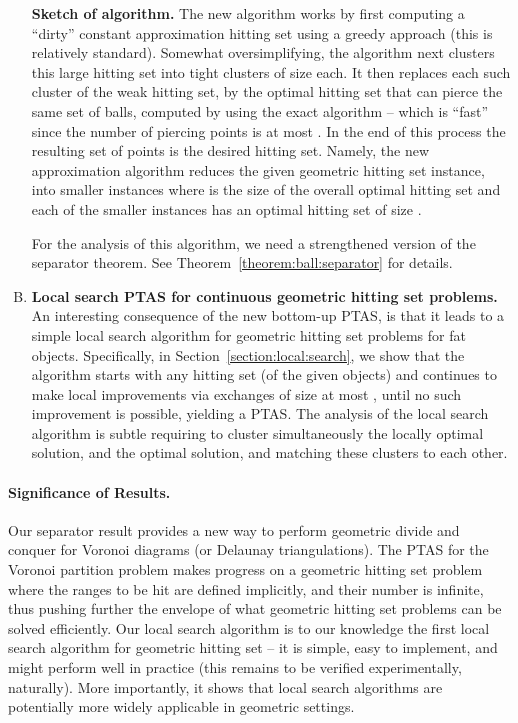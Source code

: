 \InSubmitVer{\documentclass[11pt]{article}}
\numberwithin{figure}{section}
\numberwithin{table}{section}
\numberwithin{equation}{section}
\newcommand{\secref}[1]{Section~\ref{section:#1}}
\newcommand{\thmrefpage}[1]{Theorem~\ref{theorem:#1}}
\newcommand{\Term}[1]{\textsf{#1}}
\newcommand{\PTAS}{\Term{PTAS}\xspace}
\begin{document}
\begin{enumerate}[(A)]
        
    \medskip \textbf{Sketch of algorithm.} The new algorithm works by first computing a ``dirty'' constant
    approximation hitting set using a greedy approach (this is
    relatively standard). Somewhat oversimplifying, the algorithm next
    clusters this large hitting set into tight clusters of size  each. It then replaces each such cluster of the weak
    hitting set, by the optimal hitting set that can pierce the same
    set of balls, computed by using the exact algorithm -- which is
    ``fast'' since the number of piercing points is at most
    . In the end of this process the resulting set of
    points is the desired hitting set.  Namely, the new approximation
    algorithm reduces the given geometric hitting set instance, into
     smaller instances where  is the size of the overall
    optimal hitting set and each of the smaller instances has an
    optimal hitting set of size .
    


    For the analysis of this algorithm, we need a strengthened version
    of the separator theorem. See \thmrefpage{ball:separator} for
    details.
    
    \item \textbf{Local search \PTAS for continuous geometric hitting
       set problems.} An interesting consequence of the new bottom-up \PTAS, is that it
    leads to a simple local search algorithm for geometric hitting set
    problems for fat objects. Specifically, in \secref{local:search},
    we show that the algorithm starts with any hitting set (of the
    given objects) and continues to make local improvements via
    exchanges of size at most , until no such
    improvement is possible, yielding a \PTAS.  The analysis of the
    local search algorithm is subtle requiring to cluster
    simultaneously the locally optimal solution, and the optimal
    solution, and matching these clusters to each other.

\end{enumerate}



\paragraph{Significance of Results.}

Our separator result provides a new way to perform geometric divide
and conquer for Voronoi diagrams (or Delaunay triangulations).  The
\PTAS for the Voronoi partition problem makes progress on a geometric
hitting set problem where the ranges to be hit are defined implicitly,
and their number is infinite, thus pushing further the envelope of
what geometric hitting set problems can be solved efficiently. Our
local search algorithm is to our knowledge the first local search
algorithm for geometric hitting set -- it is simple, easy to
implement, and might perform well in practice (this remains to be
verified experimentally, naturally). More importantly, it shows that
local search algorithms are potentially more widely applicable in
geometric settings.
\end{document}

